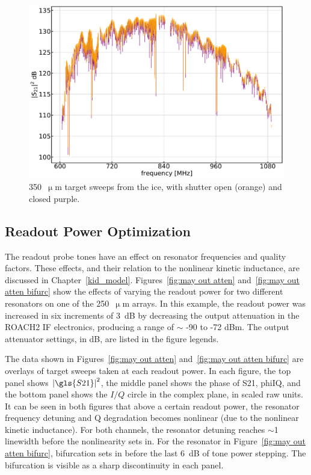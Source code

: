 \begin{figure}[!htbp]
\centering
\includegraphics[width=\textwidth]{figures/blast_data/sweeps/350_targ_ice_overplot}
\caption[~ target sweeps from the ice, with shutter open and closed.]{350~$\upmu$m target sweeps from the ice, with shutter open (orange) and closed {purple}.}
\label{fig:350 targ ice}
\end{figure}

\subsection{Readout Power Optimization}\label{readout power}

The readout probe tones have an effect on resonator frequencies and quality factors. These effects, and their relation to the nonlinear kinetic inductance, are discussed in Chapter~\ref{kid_model}. Figures~\ref{fig:may out atten} and~\ref{fig:may out atten bifurc} show the effects of varying the readout power for two different resonators on one of the 250~$\upmu$m arrays. In this example, the readout power was increased in six increments of 3~dB by decreasing the output attenuation in the ROACH2 IF electronics, producing a range of $\sim$ -90 to -72 dBm. The output attenuator settings, in dB, are listed in the figure legends.

The data shown in Figures~\ref{fig:may out atten} and~\ref{fig:may out atten bifurc} are overlays of target sweeps taken at each readout power. In each figure, the top panel shows $\left| \gls{S21} \right|^{2}$, the middle panel shows the phase of \gls{S21}, \gls{phiIQ}, and the bottom panel shows the $I/Q$ circle in the complex plane, in scaled raw units. It can be seen in both figures that above a certain readout power, the resonator frequency detuning and Q degradation becomes nonlinear (due to the nonlinear kinetic inductance). For both channels, the resonator detuning reaches $\sim$1 linewidth before the nonlinearity sets in. For the resonator in Figure~\ref{fig:may out atten bifurc}, bifurcation sets in before the last 6~dB of tone power stepping. The bifurcation is visible as a sharp discontinuity in each panel.


